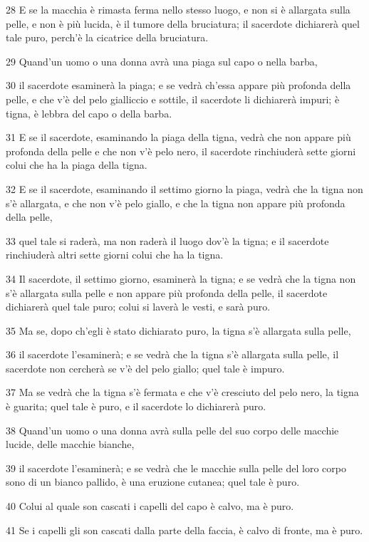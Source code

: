 \par 28 E se la macchia è rimasta ferma nello stesso luogo, e non si è allargata sulla pelle, e non è più lucida, è il tumore della bruciatura; il sacerdote dichiarerà quel tale puro, perch'è la cicatrice della bruciatura.
\par 29 Quand'un uomo o una donna avrà una piaga sul capo o nella barba,
\par 30 il sacerdote esaminerà la piaga; e se vedrà ch'essa appare più profonda della pelle, e che v'è del pelo gialliccio e sottile, il sacerdote li dichiarerà impuri; è tigna, è lebbra del capo o della barba.
\par 31 E se il sacerdote, esaminando la piaga della tigna, vedrà che non appare più profonda della pelle e che non v'è pelo nero, il sacerdote rinchiuderà sette giorni colui che ha la piaga della tigna.
\par 32 E se il sacerdote, esaminando il settimo giorno la piaga, vedrà che la tigna non s'è allargata, e che non v'è pelo giallo, e che la tigna non appare più profonda della pelle,
\par 33 quel tale si raderà, ma non raderà il luogo dov'è la tigna; e il sacerdote rinchiuderà altri sette giorni colui che ha la tigna.
\par 34 Il sacerdote, il settimo giorno, esaminerà la tigna; e se vedrà che la tigna non s'è allargata sulla pelle e non appare più profonda della pelle, il sacerdote dichiarerà quel tale puro; colui si laverà le vesti, e sarà puro.
\par 35 Ma se, dopo ch'egli è stato dichiarato puro, la tigna s'è allargata sulla pelle,
\par 36 il sacerdote l'esaminerà; e se vedrà che la tigna s'è allargata sulla pelle, il sacerdote non cercherà se v'è del pelo giallo; quel tale è impuro.
\par 37 Ma se vedrà che la tigna s'è fermata e che v'è cresciuto del pelo nero, la tigna è guarita; quel tale è puro, e il sacerdote lo dichiarerà puro.
\par 38 Quand'un uomo o una donna avrà sulla pelle del suo corpo delle macchie lucide, delle macchie bianche,
\par 39 il sacerdote l'esaminerà; e se vedrà che le macchie sulla pelle del loro corpo sono di un bianco pallido, è una eruzione cutanea; quel tale è puro.
\par 40 Colui al quale son cascati i capelli del capo è calvo, ma è puro.
\par 41 Se i capelli gli son cascati dalla parte della faccia, è calvo di fronte, ma è puro.
